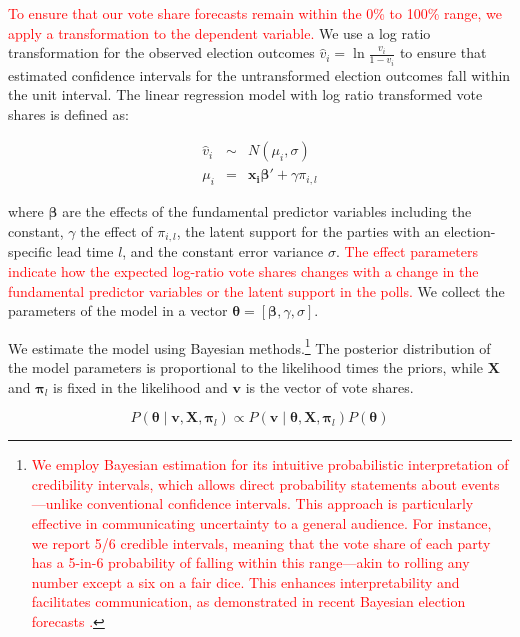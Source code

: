 \documentclass[12pt]{article}
\begin{document}
\begin{doublespacing}
\textcolor{red}{To ensure that our vote share forecasts remain within the 0\% to 100\% range, we apply a transformation to the dependent variable.}  We use a log ratio transformation for the observed election outcomes $\hat{v}_i = \ln{\frac{v_i}{1-v_i}}$ to ensure that estimated confidence intervals for the untransformed election outcomes fall within the unit interval.  The linear regression model with log ratio transformed vote shares is defined as:

\begin{eqnarray}
        \hat{v}_i &\sim& N\left(\mu_i, \sigma \right) \\
        \mu_i & =& \boldsymbol{x_i} \boldsymbol{\beta}' + \gamma {\pi}_{i,l}
\end{eqnarray}

where $\boldsymbol{\beta}$ are the effects of the fundamental predictor variables including the constant, $\gamma$ the effect of ${\pi}_{i,l}$, the latent support for the parties  with an election-specific lead time $l$, and the constant error variance $\sigma$. \textcolor{red}{The effect parameters indicate how the expected log-ratio vote shares changes with a change in the fundamental predictor variables or the latent support in the polls.} We collect the parameters of the model in a vector $\bm{\theta}  = [\bm{\beta},\gamma,\sigma]$. 

We estimate the model using Bayesian methods.\footnote{\textcolor{red}{We employ Bayesian estimation for its intuitive probabilistic interpretation of credibility intervals, which allows direct probability statements about events—unlike conventional confidence intervals. This approach is particularly effective in communicating uncertainty to a general audience. For instance, we report 5/6 credible intervals, meaning that the vote share of each party has a 5-in-6 probability of falling within this range—akin to rolling any number except a six on a fair dice. This enhances interpretability and facilitates communication, as demonstrated in recent Bayesian election forecasts \citep{Stoetzer_Neunhoeffer_Gschwend_Munzert_Sternberg_2019, Kang2024forecasting, Chen2023polls}.}} The posterior distribution of the model parameters is proportional to the likelihood times the priors, while $\boldsymbol{X}$ and $\boldsymbol{\pi}_{l}$ is fixed in the likelihood  and $\bm{v}$ is the vector of vote shares. 

\begin{equation}
    P\left(\bm{\theta} \mid \bm{v},  \bm{X},  \bm{\pi}_{l} \right) \propto  P\left(\bm{v} \mid \bm{\theta},\bm{X},  \bm{\pi}_{l}\right) P\left(\bm{\theta}\right)
\end{equation}


\end{doublespacing}
\end{document}
